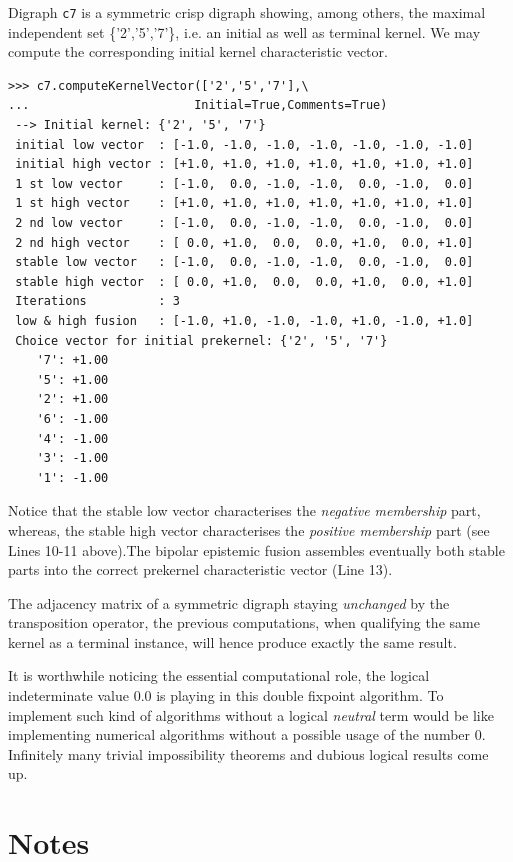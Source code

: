 Digraph \texttt{c7} is a symmetric crisp digraph showing, among others, the maximal independent set \{'2','5','7'\}, i.e. an initial as well as terminal kernel. We may compute the corresponding initial kernel characteristic vector.
\begin{lstlisting}
>>> c7.computeKernelVector(['2','5','7'],\
...                       Initial=True,Comments=True)
 --> Initial kernel: {'2', '5', '7'}
 initial low vector  : [-1.0, -1.0, -1.0, -1.0, -1.0, -1.0, -1.0]
 initial high vector : [+1.0, +1.0, +1.0, +1.0, +1.0, +1.0, +1.0]
 1 st low vector     : [-1.0,  0.0, -1.0, -1.0,  0.0, -1.0,  0.0]
 1 st high vector    : [+1.0, +1.0, +1.0, +1.0, +1.0, +1.0, +1.0]
 2 nd low vector     : [-1.0,  0.0, -1.0, -1.0,  0.0, -1.0,  0.0]
 2 nd high vector    : [ 0.0, +1.0,  0.0,  0.0, +1.0,  0.0, +1.0]
 stable low vector   : [-1.0,  0.0, -1.0, -1.0,  0.0, -1.0,  0.0]
 stable high vector  : [ 0.0, +1.0,  0.0,  0.0, +1.0,  0.0, +1.0]
 Iterations          : 3
 low & high fusion   : [-1.0, +1.0, -1.0, -1.0, +1.0, -1.0, +1.0]
 Choice vector for initial prekernel: {'2', '5', '7'}
    '7': +1.00
    '5': +1.00
    '2': +1.00
    '6': -1.00
    '4': -1.00
    '3': -1.00
    '1': -1.00
\end{lstlisting}

Notice that the stable low vector characterises the \emph{negative membership} part, whereas, the stable high vector characterises the \emph{positive membership} part (see Lines 10-11 above).The bipolar epistemic fusion assembles eventually both stable parts into the correct prekernel characteristic vector (Line 13). 

The adjacency matrix of a symmetric digraph staying \emph{unchanged} by the transposition operator, the previous computations, when qualifying the same kernel as a terminal instance, will hence produce exactly the same result.

It is worthwhile noticing the essential computational role, the logical indeterminate value $0.0$ is playing in this double fixpoint algorithm. To implement such kind of algorithms without a logical \emph{neutral} term would be like implementing numerical algorithms without a possible usage of the number $0$. Infinitely many trivial impossibility theorems and dubious logical results come up. 

{}
\section*{Notes}

